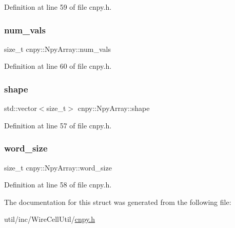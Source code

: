 Definition at line 59 of file cnpy.\+h.

\mbox{\label{structcnpy_1_1_npy_array_a8eba9ba1c8987d9364312b579f3444b8}} 
\subsubsection{\texorpdfstring{num\+\_\+vals}{num\_vals}}
{\footnotesize\ttfamily size\+\_\+t cnpy\+::\+Npy\+Array\+::num\+\_\+vals}



Definition at line 60 of file cnpy.\+h.

\mbox{\label{structcnpy_1_1_npy_array_a60dc8f8953d4b90d5a71a2af42f8de83}} 
\subsubsection{\texorpdfstring{shape}{shape}}
{\footnotesize\ttfamily std\+::vector$<$size\+\_\+t$>$ cnpy\+::\+Npy\+Array\+::shape}



Definition at line 57 of file cnpy.\+h.

\mbox{\label{structcnpy_1_1_npy_array_ada76e18467c2e3d2c3100fdde6dce358}} 
\subsubsection{\texorpdfstring{word\+\_\+size}{word\_size}}
{\footnotesize\ttfamily size\+\_\+t cnpy\+::\+Npy\+Array\+::word\+\_\+size}



Definition at line 58 of file cnpy.\+h.



The documentation for this struct was generated from the following file\+:\begin{DoxyCompactItemize}
\item 
util/inc/\+Wire\+Cell\+Util/\hyperlink{cnpy_8h}{cnpy.\+h}\end{DoxyCompactItemize}
